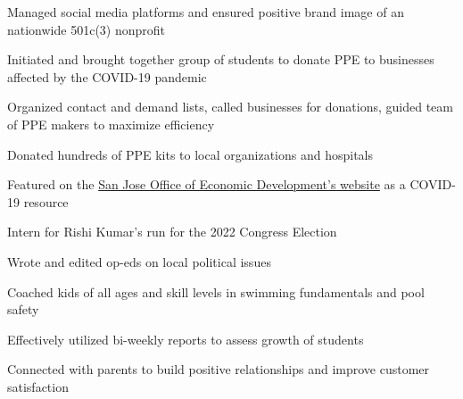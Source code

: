 \documentclass[letterpaper]{resume-shreeram}
\begin{document}
\begin{compactitem}
    \item Managed social media platforms and ensured positive brand
      image of an nationwide 501c(3) nonprofit
\end{compactitem}

\begin{compactitem}
    \item Initiated and brought together group of students to donate PPE
      to businesses affected by the COVID-19 pandemic

    \item Organized contact and demand lists, called businesses for
      donations, guided team of PPE makers to maximize efficiency

    \item Donated hundreds of PPE kits to local organizations and
      hospitals

    \item Featured on the
      \href{https://www.sjeconomy.com/why-san-jose/covid-19-guidance/local-suppliers}{San
      Jose Office of Economic Development's website} as a COVID-19
      resource
\end{compactitem}

\begin{compactitem}
    \item Intern for Rishi Kumar's run for the 2022 Congress Election

    \item Wrote and edited op-eds on local political issues
\end{compactitem}

\begin{compactitem}
    \item Coached kids of all ages and skill levels in swimming
      fundamentals and pool safety

    \item Effectively utilized bi-weekly reports to assess growth of
      students

    \item Connected with parents to build positive relationships and
      improve customer satisfaction
\end{compactitem}
\end{document}
